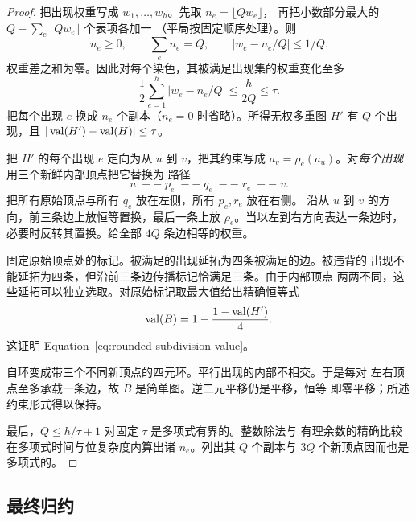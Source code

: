 \begin{proof}
把出现权重写成 $w_1,\ldots,w_h$。先取 $n_e=\lfloor Qw_e\rfloor$，
再把小数部分最大的 $Q-\sum_e\lfloor Qw_e\rfloor$ 个表项各加一
（平局按固定顺序处理）。则
\[
 n_e\ge0,\qquad \sum_e n_e=Q,\qquad
 |w_e-n_e/Q|\le1/Q.
\]
权重差之和为零。因此对每个染色，其被满足出现集的权重变化至多
\[
 \frac12\sum_{e=1}^h|w_e-n_e/Q|
 \le\frac{h}{2Q}\le\tau.
\]
把每个出现 $e$ 换成 $n_e$ 个副本（$n_e=0$ 时省略）。所得无权多重图
$H'$ 有 $Q$ 个出现，且 $|\operatorname{val}(H')-\operatorname{val}(H)|\le\tau$。

把 $H'$ 的每个出现 $e$ 定向为从 $u$ 到 $v$，把其约束写成
$a_v=\rho_e(a_u)$。对\emph{每个出现}用三个新鲜内部顶点把它替换为
路径
\[
 u\;--\;p_e\;--\;q_e\;--\;r_e\;--\;v.
\]
把所有原始顶点与所有 $q_e$ 放在左侧，所有 $p_e,r_e$ 放在右侧。
沿从 $u$ 到 $v$ 的方向，前三条边上放恒等置换，最后一条上放
$\rho_e$。当以左到右方向表达一条边时，必要时反转其置换。给全部
$4Q$ 条边相等的权重。

固定原始顶点处的标记。被满足的出现延拓为四条被满足的边。被违背的
出现不能延拓为四条，但沿前三条边传播标记恰满足三条。由于内部顶点
两两不同，这些延拓可以独立选取。对原始标记取最大值给出精确恒等式
\begin{equation}
 \operatorname{val}(B)=1-\frac{1-\operatorname{val}(H')}{4}.
 \label{eq:bipartization-value}
\end{equation}
这证明 Equation~\eqref{eq:rounded-subdivision-value}。

自环变成带三个不同新顶点的四元环。平行出现的内部不相交。于是每对
左右顶点至多承载一条边，故 $B$ 是简单图。逆二元平移仍是平移，恒等
即零平移；所述约束形式得以保持。

最后，$Q\le h/\tau+1$ 对固定 $\tau$ 是多项式有界的。整数除法与
有理余数的精确比较在多项式时间与位复杂度内算出诸 $n_e$。列出其
$Q$ 个副本与 $3Q$ 个新顶点因而也是多项式的。
\end{proof}

\subsection{最终归约}


